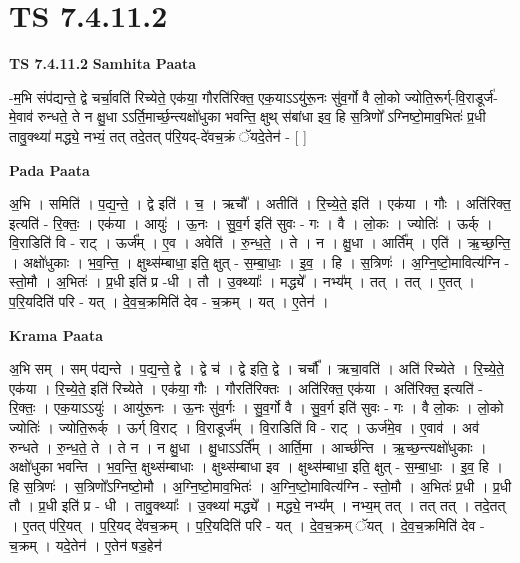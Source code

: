 \documentclass[17pt]{extarticle}
\begin{document}
\section{ TS 7.4.11.2 }

\textbf{TS 7.4.11.2 } \newline
\textbf{Samhita Paata} \newline

-म॒भि संप॑द्यन्ते॒ द्वे चर्चा॒वति॑ रिच्येते॒ एक॑या॒ गौरति॑रिक्त॒ एक॒याऽऽयु॑रू॒नः सु॑व॒र्गो वै लो॒को ज्योति॒रूर्ग्-वि॒राडूर्ज॑-मे॒वाव॑ रुन्धते॒ ते न क्षु॒धा ऽऽर्ति॒मार्च्छ॒न्त्यक्षो॑धुका भवन्ति॒ क्षुथ् स॑बांधा इव॒ हि स॒त्रिणो᳚ ऽग्निष्टो॒माव॒भितः॑ प्र॒धी तावु॒क्थ्या॑ मद्ध्ये॒ नभ्यं॒ तत् तदे॒तत् प॑रि॒यद्-दे॑वच॒क्रं ॅयदे॒तेन॑ - [  ] \newline

\textbf{Pada Paata} \newline

अ॒भि । समिति॑ । प॒द्य॒न्ते॒ । द्वे इति॑ । च॒ । ऋचौ᳚ । अतीति॑ । रि॒च्ये॒ते॒ इति॑ । एक॑या । गौः । अति॑रिक्त॒ इत्यति॑ - रि॒क्तः॒ । एक॑या । आयुः॑ । ऊ॒नः । सु॒व॒र्ग इति॑ सुवः - गः । वै । लो॒कः । ज्योतिः॑ । ऊर्क् । वि॒राडिति॑ वि - राट् । ऊर्ज᳚म् । ए॒व । अवेति॑ । रु॒न्ध॒ते॒ । ते । न । क्षु॒धा । आर्ति᳚म् । एति॑ । ऋ॒च्छ॒न्ति॒ । अक्षो॑धुकाः । भ॒व॒न्ति॒ । क्षुथ्स॑म्बाधा॒ इति॒ क्षुत् - स॒म्बा॒धाः॒ । इ॒व॒ । हि । स॒त्रिणः॑ । अ॒ग्नि॒ष्टो॒मावित्य॑ग्नि - स्तो॒मौ । अ॒भितः॑ । प्र॒धी इति॑ प्र -धी । तौ । उ॒क्थ्याः᳚ । मद्ध्ये᳚ । नभ्य᳚म् । तत् । तत् । ए॒तत् । प॒रि॒यदिति॑ परि - यत् । दे॒व॒च॒क्रमिति॑ देव - च॒क्रम् । यत् । ए॒तेन॑ ।  \newline


\textbf{Krama Paata} \newline

अ॒भि सम् । सम् प॑द्यन्ते । प॒द्य॒न्ते॒ द्वे । द्वे च॑ । द्वे इति॒ द्वे । चर्चौ᳚ । ऋचा॒वति॑ । अति॑ रिच्येते । रि॒च्ये॒ते॒ एक॑या । रि॒च्ये॒ते॒ इति॑ रिच्येते । एक॑या॒ गौः । गौरति॑रिक्तः । अति॑रिक्त॒ एक॑या । अति॑रिक्त॒ इत्यति॑ - रि॒क्तः॒ । एक॒याऽऽयुः॑ । आयु॑रू॒नः । ऊ॒नः सु॑व॒र्गः । सु॒व॒र्गो वै । सु॒व॒र्ग इति॑ सुवः - गः । वै लो॒कः । लो॒को ज्योतिः॑ । ज्योति॒रूर्क् । ऊर्ग् वि॒राट् । वि॒राडूर्ज᳚म् । वि॒राडिति॑ वि - राट् । ऊर्ज॑मे॒व । ए॒वाव॑ । अव॑ रुन्धते । रु॒न्ध॒ते॒ ते । ते न । न क्षु॒धा । क्षु॒धाऽऽर्ति᳚म् । आर्ति॒मा । आर्च्छ॑न्ति । ऋ॒च्छ॒न्त्यक्षो॑धुकाः । अक्षो॑धुका भवन्ति । भ॒व॒न्ति॒ क्षुथ्स॑म्बाधाः । क्षुथ्स॑म्बाधा इव । क्षुथ्स॑म्बाधा॒ इति॒ क्षुत् - स॒म्बा॒धाः॒ । इ॒व॒ हि । हि स॒त्रिणः॑ । स॒त्रिणो᳚ऽग्निष्टो॒मौ । अ॒ग्नि॒ष्टो॒माव॒भितः॑ । अ॒ग्नि॒ष्टो॒मावित्य॑ग्नि - स्तो॒मौ । अ॒भितः॑ प्र॒धी । प्र॒धी तौ । प्र॒धी इति॑ प्र - धी । तावु॒क्थ्याः᳚ । उ॒क्थ्या॑ मद्ध्ये᳚ । मद्ध्ये॒ नभ्य᳚म् । नभ्य॒म् तत् । तत् तत् । तदे॒तत् । ए॒तत् प॑रि॒यत् । प॒रि॒यद् दे॑वच॒क्रम् । प॒रि॒यदिति॑ परि - यत् । दे॒व॒च॒क्रम् ॅयत् । दे॒व॒च॒क्रमिति॑ देव - च॒क्रम् । यदे॒तेन॑ । ए॒तेन॑ षड॒हेन॑ \newline
\end{document}
